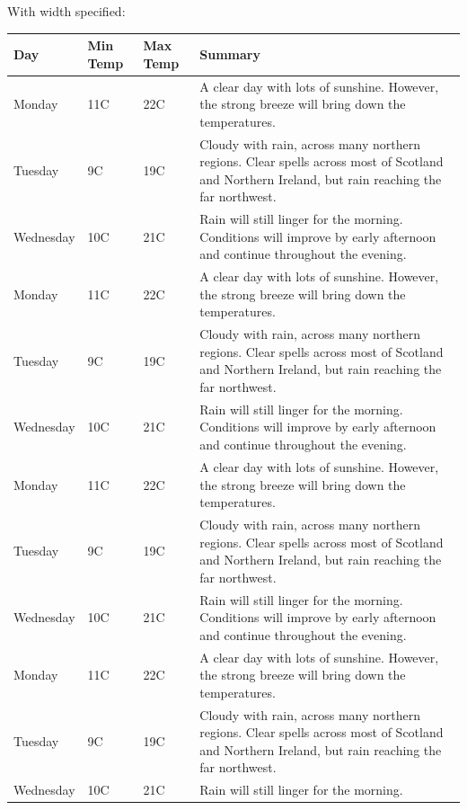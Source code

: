 \documentclass{article}
\begin{document}
	With width specified:
	\begin{center}
	    \begin{longtable}{ | l | l | l | p{} |}
	    \hline
	    Day & Min Temp & Max Temp & Summary \\ \hline
	    \endhead
	    Monday & 11C & 22C & A clear day with lots of sunshine.  
	    However, the strong breeze will bring down the temperatures. \\ \hline
	    Tuesday & 9C & 19C & Cloudy with rain, across many northern regions. Clear spells 
	    across most of Scotland and Northern Ireland, 
	    but rain reaching the far northwest. \\ \hline
	    Wednesday & 10C & 21C & Rain will still linger for the morning. 
	    Conditions will improve by early afternoon and continue 
	    throughout the evening. \\
	    Monday & 11C & 22C & A clear day with lots of sunshine.  
	    However, the strong breeze will bring down the temperatures. \\ \hline
	    Tuesday & 9C & 19C & Cloudy with rain, across many northern regions. Clear spells 
	    across most of Scotland and Northern Ireland, 
	    but rain reaching the far northwest. \\ \hline
	    Wednesday & 10C & 21C & Rain will still linger for the morning. 
	    Conditions will improve by early afternoon and continue 
	    throughout the evening. \\
	    Monday & 11C & 22C & A clear day with lots of sunshine.  
	    However, the strong breeze will bring down the temperatures. \\ \hline
	    Tuesday & 9C & 19C & Cloudy with rain, across many northern regions. Clear spells 
	    across most of Scotland and Northern Ireland, 
	    but rain reaching the far northwest. \\ \hline
	    Wednesday & 10C & 21C & Rain will still linger for the morning. 
	    Conditions will improve by early afternoon and continue 
	    throughout the evening. \\
	    Monday & 11C & 22C & A clear day with lots of sunshine.  
	    However, the strong breeze will bring down the temperatures. \\ \hline
	    Tuesday & 9C & 19C & Cloudy with rain, across many northern regions. Clear spells 
	    across most of Scotland and Northern Ireland, 
	    but rain reaching the far northwest. \\ \hline
	    Wednesday & 10C & 21C & Rain will still linger for the morning. 

\end{longtable}
\end{center}
\end{document}
